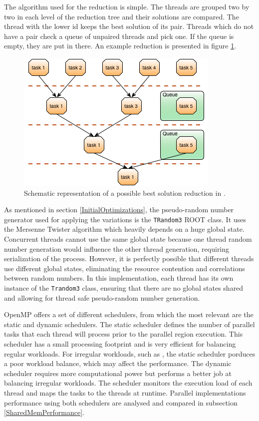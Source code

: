 The algorithm used for the reduction is simple. The threads are grouped two by two in each level of the reduction tree and their solutions are compared. The thread with the lower id keeps the best solution of its pair. Threads which do not have a pair check a queue of unpaired threads and pick one. If the queue is empty, they are put in there. An example reduction is presented in figure \ref{fig:Reduction}.

\begin{figure}[!htp]
	\begin{center}
		\includegraphics[scale=0.7]{../../common/img/parallel_reduction_example.png}
		\caption{Schematic representation of a possible best solution reduction in \ttDilepKinFit.}
		\label{fig:Reduction}
	\end{center}
\end{figure}

As mentioned in section \ref{InitialOptimizations}, the pseudo-random number generator used for applying the variations is the \texttt{TRandom3} ROOT class. It uses the Mersenne Twister algorithm which heavily depends on a huge global state. Concurrent threads cannot use the same global state because one thread random number generation would influence the other thread generation, requiring serialization of the process. However, it is perfectly possible that different threads use different global states, eliminating the resource contention and correlations between random numbers. In this implementation, each thread has its own instance of the \texttt{Trandom3} class, ensuring that there are no global states shared and allowing for thread safe pseudo-random number generation.

OpenMP offers a set of different schedulers, from which the most relevant are the static and dynamic schedulers. The static scheduler defines the number of parallel tasks that each thread will process prior to the parallel region execution. This scheduler has a small processing footprint and is very efficient for balancing regular workloads. For irregular workloads, such as \ttDilepKinFit, the static scheduler porduces a poor workload balance, which may affect the performance. The dynamic scheduler requires more computational power but performs a better job at balancing irregular workloads. The scheduler monitors the execution load of each thread and maps the tasks to the threads at runtime. Parallel implementations performance using both schedulers are analysed and compared in subsection \ref{SharedMemPerformance}.

